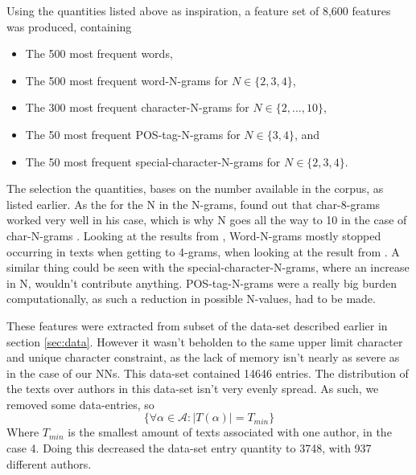 Using the quantities listed above as inspiration, a feature set of 8,600
features was produced, containing

\begin{itemize}
    \item The 500 most frequent words,
    \item The 500 most frequent word-N-grams for $N \in \{2,3,4\}$,
    \item The 300 most frequent character-N-grams for $N \in \{2,...,10\}$,
    \item The 50 most frequent \gls{POS}-tag-N-grams for $N \in \{3,4\}$, and
    \item The 50 most frequent special-character-N-grams for $N \in \{2,3,4\}$.
\end{itemize}

The selection the quantities, bases on the number available in the corpus,
as listed earlier. As the for the N in the N-grams, \cite{aalykke2016} found
out that char-8-grams worked very well in his case, which is why N goes all
the way to 10 in the case of char-N-grams . Looking at the results
from \cite{US}, Word-N-grams mostly stopped occurring in texts when getting
to 4-grams, when looking at the result from \cite{US}. A similar thing
could be seen with the special-character-N-grams, where an increase in N,
wouldn't contribute anything. \gls{POS}-tag-N-grams were a really big burden
computationally, as such a reduction in possible N-values, had to be made.

These features were extracted from subset of the data-set described earlier
in section \ref{sec:data}. However it wasn't beholden to the same upper limit
character and unique character constraint, as the lack of memory isn't nearly
as severe as in the case of our \gls{NN}s. This data-set contained 14646
entries. The distribution of the texts over authors in this data-set isn't
very evenly spread. As such, we removed some data-entries, so $$\{\forall \alpha
\in \mathcal{A}: |T(\alpha)| = T_{min}\}$$ Where $T_{min}$ is the smallest amount
of texts associated with one author, in the case 4. Doing this decreased the
data-set entry quantity to 3748, with 937 different authors.

